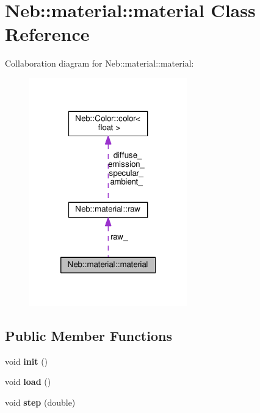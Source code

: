 \hypertarget{classNeb_1_1material_1_1material}{\section{Neb\-:\-:material\-:\-:material Class Reference}
\label{classNeb_1_1material_1_1material}
}


Collaboration diagram for Neb\-:\-:material\-:\-:material\-:
\nopagebreak
\begin{figure}[H]
\begin{center}
\leavevmode
\includegraphics[width=194pt]{classNeb_1_1material_1_1material__coll__graph}
\end{center}
\end{figure}
\subsection*{Public Member Functions}
\begin{DoxyCompactItemize}
\item 
\hypertarget{classNeb_1_1material_1_1material_ab5d6f13137fb8d7fe5a591b426db6ac5}{void {\bfseries init} ()}\label{classNeb_1_1material_1_1material_ab5d6f13137fb8d7fe5a591b426db6ac5}

\item 
\hypertarget{classNeb_1_1material_1_1material_adcac6665af9b5370b2ba1f9ea909df0d}{void {\bfseries load} ()}\label{classNeb_1_1material_1_1material_adcac6665af9b5370b2ba1f9ea909df0d}

\item 
\hypertarget{classNeb_1_1material_1_1material_a19703d401881b74470f89eada4fa4341}{void {\bfseries step} (double)}\label{classNeb_1_1material_1_1material_a19703d401881b74470f89eada4fa4341}

\end{DoxyCompactItemize}
